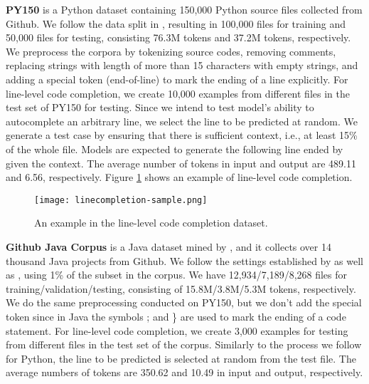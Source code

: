 \documentclass[sigconf,nonacm,screen]{acmart}
\begin{document}
 \textbf{PY150} is a Python dataset \cite{raychev2016probabilistic} containing 150,000 Python source files collected from Github. We follow the data split in \citet{raychev2016probabilistic}, resulting in 100,000 files for training and 50,000 files for testing, consisting 76.3M tokens and 37.2M tokens, respectively. We preprocess the corpora by tokenizing source codes, removing comments, replacing strings with length of more than 15 characters with empty strings, and adding a special token  (end-of-line) to mark the ending of a line explicitly. For line-level code completion, we create 10,000 examples from different files in the test set of PY150 for testing. 
 Since we intend to test model's ability to autocomplete an arbitrary line, we select the line to be predicted at random. 
  We generate a test case by ensuring that there is sufficient context, i.e., at least 15\% of the whole file.
Models are expected to generate the following line ended by  given the context.
The average number of tokens in input and output are 489.11 and 6.56, respectively. Figure \ref{fig:linecompletion-sample} shows an example of line-level code completion. 


  
 \begin{figure}[h]
    \texttt{[image: linecompletion-sample.png]}
    \caption{An example in the line-level code completion dataset.}
    \label{fig:linecompletion-sample}
\end{figure}

 \textbf{Github Java Corpus} is a Java dataset mined by \citet{allamanis2013mining}, and it collects over 14 thousand Java projects from Github. We follow the settings established by \citet{hellendoorn2017deep} as well as \citet{karampatsis2020big}, using 1\% of the subset in the corpus. We have 12,934/7,189/8,268 files for training/validation/testing, consisting of 15.8M/3.8M/5.3M tokens, respectively. We do the same preprocessing conducted on PY150, but we don't add the special token  since in Java the symbols ; and \} are used to mark the ending of a code statement. For line-level code completion, we create 3,000 examples for testing from different files in the test set of the corpus. 
 Similarly to the process we follow for Python, 
the line to be predicted is selected at random from the test file.
The average numbers of tokens are 350.62 and 10.49 in input and output, respectively.
\end{document}
